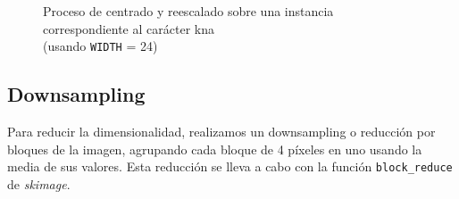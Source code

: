 \documentclass[a4]{article}
\begin{document}
\begin{figure}[H]
  \caption{Proceso de centrado y reescalado sobre una instancia correspondiente al carácter kna\\ (usando \texttt{WIDTH} = 24)}
  \label{fig:centerAndResize}
\end{figure}

\subsection{Downsampling}

Para reducir la dimensionalidad, realizamos un downsampling o
reducción por bloques de la imagen, agrupando cada bloque de 4
píxeles en uno usando la media de sus valores. Esta reducción se lleva
a cabo con la función \texttt{block\_reduce} de \textit{skimage}.
\end{document}
